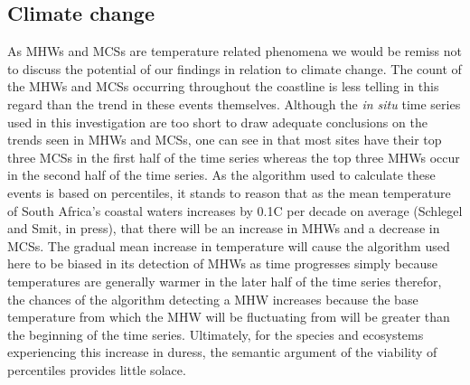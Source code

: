 \documentclass[a4paper,10pt,review]{elsarticle}
\begin{document}
\subsection{Climate change}
As MHWs and MCSs are temperature related phenomena we would be remiss not to discuss the potential of our findings in relation to climate change. The count of the MHWs and MCSs occurring throughout the coastline is less telling in this regard than the trend in these events themselves. Although the \emph{in situ} time series used in this investigation are too short to draw adequate conclusions on the trends seen in MHWs and MCSs,  one can see in  that most sites have their top three MCSs in the first half of the time series whereas the top three MHWs occur in the second half of the time series. As the algorithm used to calculate these events is based on percentiles, it stands to reason that as the mean temperature of South Africa's coastal waters increases by 0.1\degree C per decade on average (Schlegel and Smit, in press), that there will be an increase in MHWs and a decrease in MCSs. The gradual mean increase in temperature will cause the algorithm used here to be biased in its detection of MHWs as time progresses simply because temperatures are generally warmer in the later half of the time series therefor, the chances of the algorithm detecting a MHW increases because the base temperature from which the MHW will be fluctuating from will be greater than the beginning of the time series. Ultimately, for the species and ecosystems experiencing this increase in duress, the semantic argument of the viability of percentiles provides little solace. 
\end{document}
